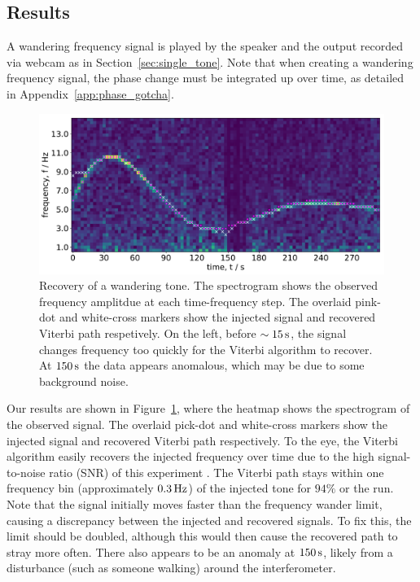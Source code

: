 \documentclass[paper-main.tex]{subfiles}
\begin{document}
\subsection{Results}
\label{sec:wanderingResults}

A wandering frequency signal is played by the speaker and the output recorded via webcam as in Section~\ref{sec:single_tone}.
Note that when creating a wandering frequency signal, the phase change must be integrated up over time, as detailed in Appendix~\ref{app:phase_gotcha}.

\begin{figure}
	\includegraphics[width=\textwidth]{figures/expt_overlay_2_viterbi_test_webcam.pdf}
	\caption{\label{fig:viterbi_overlay}
Recovery of a wandering tone. 
The spectrogram shows the observed frequency amplitdue at each time-frequency step. 
The overlaid pink-dot and white-cross markers show the injected signal and recovered Viterbi path respetively. 
On the left, before $\sim 15\,{\rm s}$, the signal changes frequency too quickly for the Viterbi algorithm to recover. 
At $150\,{\rm s}$ the data appears anomalous, which may be due to some background noise. }
\end{figure}


Our results are shown in Figure~\ref{fig:viterbi_overlay}, where the heatmap shows the spectrogram of the observed signal. 
The overlaid pick-dot and white-cross markers show the injected signal and recovered Viterbi path respectively. 
To the eye, the Viterbi algorithm easily recovers the injected frequency over time due to the high signal-to-noise ratio (SNR) of this experiment .
The Viterbi path stays within one frequency bin (approximately $0.3\,{\rm Hz}$) of the injected tone for $94\%$ or the run. 
Note that the signal initially moves faster than the frequency wander limit, causing a discrepancy between the injected and recovered signals. 
To fix this, the limit should be doubled, although this would then cause the recovered path to stray more often. 
There also appears to be an anomaly at $150\,{\rm s}$, likely from a disturbance (such as someone walking) around the interferometer.

\end{document}
